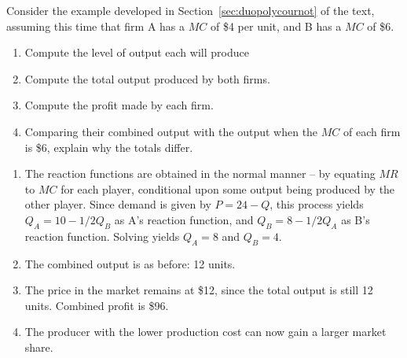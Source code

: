 \begin{enumialphparenastyle}
\begin{ex}\label{ex:ch11ex8}
Consider the example developed in Section~\ref{sec:duopolycournot} of the text, assuming this time that firm A has a $MC$ of \$4 per unit, and B has a $MC$ of \$6.
\begin{enumerate}
	\item	Compute the level of output each will produce
	\item	Compute the total output produced by both firms.
	\item	Compute the profit made by each firm.
	\item	Comparing their combined output with the output when the $MC$ of each firm is \$6, explain why the totals differ.
\end{enumerate}
\begin{sol}
\begin{enumerate}
	\item	The reaction functions are obtained in the normal manner -- by equating $MR$ to $MC$ for each player, conditional upon some output being produced by the other player. Since demand is given by $P=24-Q$, this process yields $Q_A=10-1/2Q_B$ as A's reaction function, and $Q_B=8-1/2Q_A$ as B's reaction function. Solving yields $Q_A=8$ and $Q_B=4$.
	\item	The combined output is as before: 12 units.
	\item	The price in the market remains at \$12, since the total output is still 12 units. Combined profit is \$96.
	\item	The producer with the lower production cost can now gain a larger market share.
\end{enumerate}
\end{sol}
\end{ex}


\end{enumialphparenastyle}
